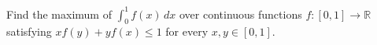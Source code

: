 Find the maximum of $\int_0^1f(x)\,dx$ over continuous functions $f:[0,1]\to\mathbb R$ satisfying $xf(y)+yf(x)\le1$ for every $x,y\in[0,1]$.
